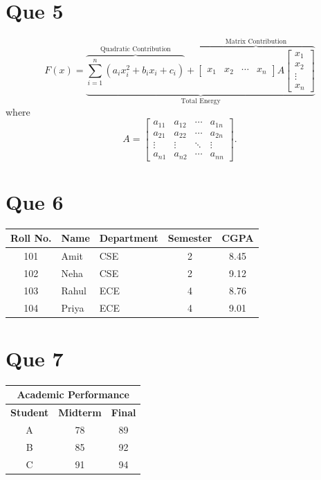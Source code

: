 \documentclass[11pt,a4paper]{article}
\begin{document}
\section*{Que 5}
\[
F(x) =
\underbrace{
    \overbrace{\sum_{i=1}^{n}\left(a_i x_i^2 + b_i x_i + c_i\right)}^{\text{Quadratic Contribution}}
    +
    \overbrace{
        \begin{bmatrix} x_1 & x_2 & \cdots & x_n \end{bmatrix}
        A
        \begin{bmatrix} x_1 \\ x_2 \\ \vdots \\ x_n \end{bmatrix}
    }^{\text{Matrix Contribution}}
}_{\text{Total Energy}}
\]
where
\[
A =
\begin{bmatrix}
    a_{11} & a_{12} & \cdots & a_{1n} \\
    a_{21} & a_{22} & \cdots & a_{2n} \\
    \vdots & \vdots & \ddots & \vdots \\
    a_{n1} & a_{n2} & \cdots & a_{nn}
\end{bmatrix}.
\]

\section*{Que 6}
\begin{center}
\begin{tabular}{|c|l|l|c|c|}
    \hline
    \textbf{Roll No.} & \textbf{Name} & \textbf{Department} & \textbf{Semester} & \textbf{CGPA} \\
    \hline
    101 & Amit  & CSE & 2 & 8.45 \\ \hline
    102 & Neha  & CSE & 2 & 9.12 \\ \hline
    103 & Rahul & ECE & 4 & 8.76 \\ \hline
    104 & Priya & ECE & 4 & 9.01 \\ \hline
\end{tabular}
\end{center}

\section*{Que 7}
\begin{center}
\begin{tabular}{|c|c|c|}
    \hline
    \multicolumn{3}{|c|}{\textbf{Academic Performance}} \\
    \hline
    \textbf{Student} & \textbf{Midterm} & \textbf{Final} \\
    \hline
    A & 78 & 89 \\
    B & 85 & 92 \\
    C & 91 & 94 \\
    \hline
\end{tabular}
\end{center}
\end{document}
